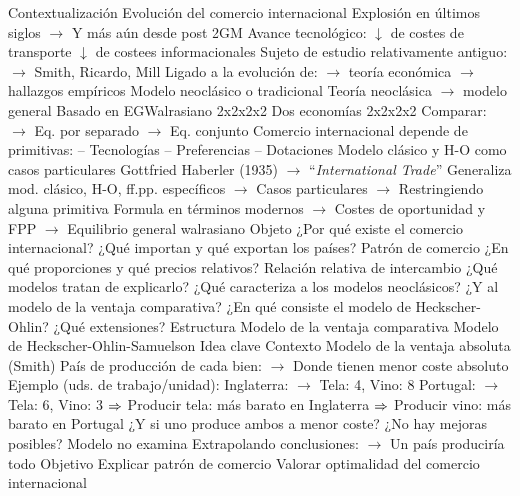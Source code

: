 \documentclass{nuevotema}
\begin{document}
\begin{esquemal}
	\1[] 
		\2 Contextualización
			\3 Evolución del comercio internacional
				\4 Explosión en últimos siglos
				\4[] $\to$ Y más aún desde post 2GM
				\4 Avance tecnológico:
				\4[] $\downarrow$ de costes de transporte
				\4[] $\downarrow$ de costees informacionales
				\4 Sujeto de estudio relativamente antiguo:
				\4[] $\to$ Smith, Ricardo, Mill
				\4[] Ligado a la evolución de:
				\4[] $\to$ teoría económica
				\4[] $\to$ hallazgos empíricos
			\3 Modelo neoclásico o tradicional
				\4 Teoría neoclásica $\to$ modelo general
				\4[] Basado en EGWalrasiano 2x2x2x2
				\4[] Dos economías 2x2x2x2
				\4[] Comparar:
				\4[] $\to$ Eq. por separado
				\4[] $\to$ Eq. conjunto
				\4[$\then$] Comercio internacional depende de primitivas:
				\4[] -- Tecnologías
				\4[] -- Preferencias
				\4[] -- Dotaciones
			\3 Modelo clásico y H-O como casos particulares
				\4[] Gottfried Haberler (1935)
				\4[] $\to$ ``\textit{International Trade}''
				\4[] Generaliza mod. clásico, H-O, ff.pp. específicos
				\4[] $\to$ Casos particulares
				\4[] $\to$ Restringiendo alguna primitiva
				\4[] Formula en términos modernos
				\4[] $\to$ Costes de oportunidad y FPP
				\4[] $\to$ Equilibrio general walrasiano
		\2 Objeto
			\3 ¿Por qué existe el comercio internacional?
			\3 ¿Qué importan y qué exportan los países?
				\4[$\to$] Patrón de comercio
			\3 ¿En qué proporciones y qué precios relativos?
				\4[$\to$] Relación relativa de intercambio
			\3 ¿Qué modelos tratan de explicarlo?
				\4[$\to$] ¿Qué caracteriza a los modelos neoclásicos?
				\4[$\to$] ¿Y al modelo de la ventaja comparativa?
				\4[$\to$] ¿En qué consiste el modelo de Heckscher-Ohlin?
				\4[$\to$] ¿Qué extensiones?
		\2 Estructura
			\3 Modelo de la ventaja comparativa
			\3 Modelo de Heckscher-Ohlin-Samuelson
	\1 
		\2 Idea clave
			\3 Contexto
				\4 Modelo de la ventaja absoluta (Smith)
				\4[] País de producción de cada bien:
				\4[] $\to$ Donde tienen menor coste absoluto
				\4[] Ejemplo (uds. de trabajo/unidad):
				\4[] Inglaterra:
				\4[] $\to$ Tela: 4, Vino: 8
				\4[] Portugal:
				\4[] $\to$ Tela: 6, Vino: 3
				\4[] $\then$ Producir tela: más barato en Inglaterra
				\4[] $\then$ Producir vino: más barato en Portugal
				\4 ¿Y si uno produce ambos a menor coste?
				\4[] ¿No hay mejoras posibles?
				\4[] Modelo no examina
				\4[] Extrapolando conclusiones:
				\4[] $\to$ Un país produciría todo
			\3 Objetivo
				\4 Explicar patrón de comercio
				\4 Valorar optimalidad del comercio internacional

\end{esquemal}
\end{document}
